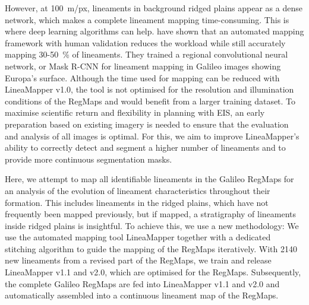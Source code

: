 However, at 100~m/px, lineaments in background ridged plains appear as a dense network, which makes a complete lineament mapping time-consuming. This is where deep learning algorithms can help.  have shown that an automated mapping framework with human validation reduces the workload while still accurately mapping 30-50~\% of lineaments. They trained a regional convolutional neural network, or Mask R-CNN for lineament mapping in Galileo images showing Europa's surface. Although the time used for mapping can be reduced with LineaMapper v1.0, the tool is not optimised for the resolution and illumination conditions of the RegMaps and would benefit from a larger training dataset. 
To maximise scientific return and flexibility in planning with EIS, an early preparation based on existing imagery is needed to ensure that the evaluation and analysis of all images is optimal. For this, we aim to improve LineaMapper's ability to correctly detect and segment a higher number of lineaments and to provide more continuous segmentation masks.


Here, we attempt to map all identifiable lineaments in the Galileo RegMaps for an analysis of the evolution of lineament characteristics throughout their formation. This includes lineaments in the ridged plains, which have not frequently been mapped previously, but if mapped, a stratigraphy of lineaments inside ridged plains is insightful.
To achieve this, we use a new methodology: We use the automated mapping tool LineaMapper together with a dedicated stitching algorithm to guide the mapping of the RegMaps iteratively. With 2140 new lineaments from a revised part of the RegMaps, we train and release LineaMapper v1.1 and v2.0, which are optimised for the RegMaps. Subsequently, the complete Galileo RegMaps are fed into LineaMapper v1.1 and v2.0 and automatically assembled into a continuous lineament map of the RegMaps.

